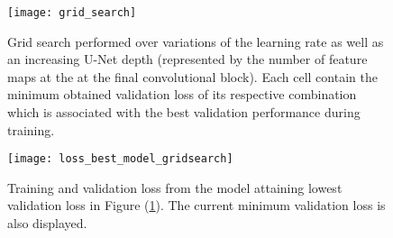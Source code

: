 \documentclass[../main/thesis]{subfiles}
\begin{document}
\begin{figure}
    \centering
    \texttt{[image: grid\_search]}
    \caption{\label{fig:gs}Grid search performed over variations of the learning rate as well as an increasing U-Net depth (represented by the number of feature maps at the at the final convolutional block). Each cell contain the minimum obtained validation loss of its respective combination which is associated with the best validation performance during training.}
\end{figure}


\begin{figure}
    \centering
    \texttt{[image: loss\_best\_model\_gridsearch]}
    \caption{\label{fig:loss_curve_from_gs}Training and validation loss from the model attaining lowest validation loss in Figure (\ref{fig:gs}). The current minimum validation loss is also displayed.}
\end{figure}

\biblio
\end{document}
